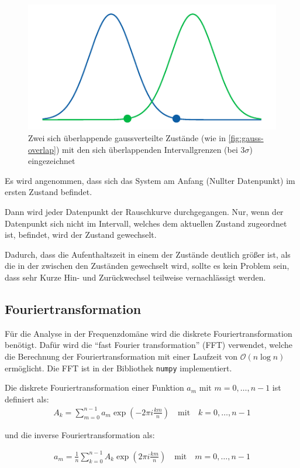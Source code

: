 \documentclass[main.tex]{subfiles}
\begin{document}
\begin{figure}[h]
    \centering
    \includegraphics{bilder/plots/theo-vis/bounds.pdf}
    \caption{Zwei sich überlappende gaussverteilte Zustände (wie in \cref{fig:gauss-overlap}) mit den sich überlappenden Intervallgrenzen (bei \(3\sigma\)) eingezeichnet }
\end{figure}


Es wird angenommen, dass sich das System am Anfang (Nullter Datenpunkt) im ersten Zustand befindet.

Dann wird jeder Datenpunkt der Rauschkurve durchgegangen. Nur, wenn der Datenpunkt sich nicht im Intervall, welches dem aktuellen Zustand zugeordnet ist, befindet, wird der Zustand gewechselt. 

Dadurch, dass die Aufenthaltszeit in einem der Zustände deutlich größer ist, als die in der zwischen den Zuständen gewechselt wird, sollte es kein Problem sein, dass sehr Kurze Hin- und Zurückwechsel teilweise vernachlässigt werden. 

\subsection{Fouriertransformation}

Für die Analyse in der Frequenzdomäne wird die diskrete Fouriertransformation
benötigt. Dafür wird die \enquote{fast Fourier transformation} (FFT) verwendet,
welche die Berechnung der Fouriertransformation mit einer Laufzeit von
$\mathcal{O}(n \log n)$ ermöglicht. Die FFT ist in der Bibliothek
\texttt{numpy} \cite{numpy-fft} implementiert.

Die diskrete Fouriertransformation einer Funktion $a_m$ mit $m = 0, \dots, n-1$
ist definiert als:
\begin{align}
    A_k = \sum_{m=0}^{n-1} a_m \exp(-2 \pi i\frac{ k m}{n}) \quad \text{mit}
    \quad k = 0, \dots, n-1
\end{align}

und die inverse Fouriertransformation als:

\begin{align}
    a_m = \frac{1}{n} \sum_{k=0}^{n-1} A_k \exp(2 \pi i\frac{ k m}{n}) \quad
    \text{mit} \quad m = 0, \dots, n-1
\end{align}




\end{document}

